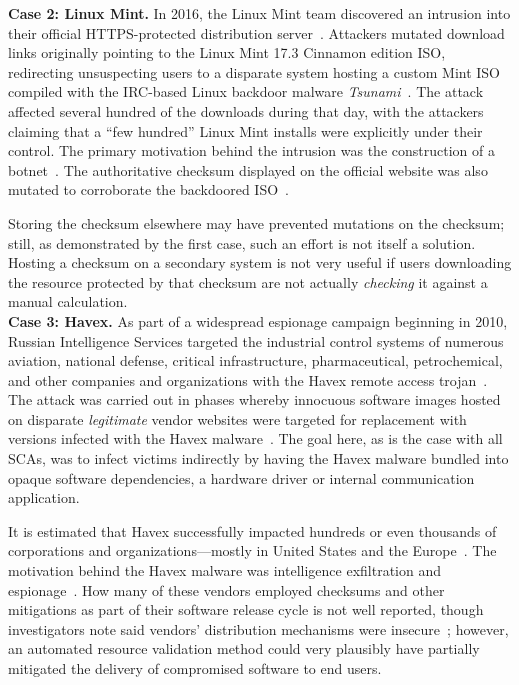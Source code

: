 \noindent\textbf{Case 2: Linux Mint.} In 2016, the Linux Mint team discovered an
intrusion into their official HTTPS-protected distribution
server~\cite{SCA-MINT1}. Attackers mutated download links originally pointing to
the Linux Mint 17.3 Cinnamon edition ISO, redirecting unsuspecting users to a
disparate system hosting a custom Mint ISO compiled with the IRC-based Linux
backdoor malware \emph{Tsunami}~\cite{SCA-MINT2}. The attack affected several
hundred of the downloads during that day, with the attackers claiming that a
``few hundred'' Linux Mint installs were explicitly under their control. The
primary motivation behind the intrusion was the construction of a
botnet~\cite{SCA-MINT3}. The authoritative checksum displayed on the official
website was also mutated to corroborate the backdoored ISO~\cite{SCA-MINT3}.

Storing the checksum elsewhere may have prevented mutations on the checksum;
still, as demonstrated by the first case, such an effort is not itself a
solution. Hosting a checksum on a secondary system is not very useful if users
downloading the resource protected by that checksum are not actually
\emph{checking} it against a manual calculation. \\

\noindent\textbf{Case 3: Havex.} As part of a widespread espionage campaign
beginning in 2010, Russian Intelligence Services targeted the industrial control
systems of numerous aviation, national defense, critical infrastructure,
pharmaceutical, petrochemical, and other companies and organizations with the
Havex remote access trojan~\cite{SCA-HAVEX1, SCA-HAVEX2}. The attack was carried
out in phases whereby innocuous software images hosted on disparate
\emph{legitimate} vendor websites were targeted for replacement with versions
infected with the Havex malware~\cite{SCA-HAVEX2}. The goal here, as is the case
with all SCAs, was to infect victims indirectly by having the Havex malware
bundled into opaque software dependencies, \ie a hardware driver or internal
communication application.

It is estimated that Havex successfully impacted hundreds or even thousands of
corporations and organizations---mostly in United States and the
Europe~\cite{SCA-HAVEX2}. The motivation behind the Havex malware was
intelligence exfiltration and espionage~\cite{SCA-HAVEX1}. How many of these
vendors employed checksums and other mitigations as part of their software
release cycle is not well reported, though investigators note said vendors'
distribution mechanisms were insecure~\cite{SCA-HAVEX2}; however, an automated
resource validation method could very plausibly have partially mitigated the
delivery of compromised software to end users. \\

